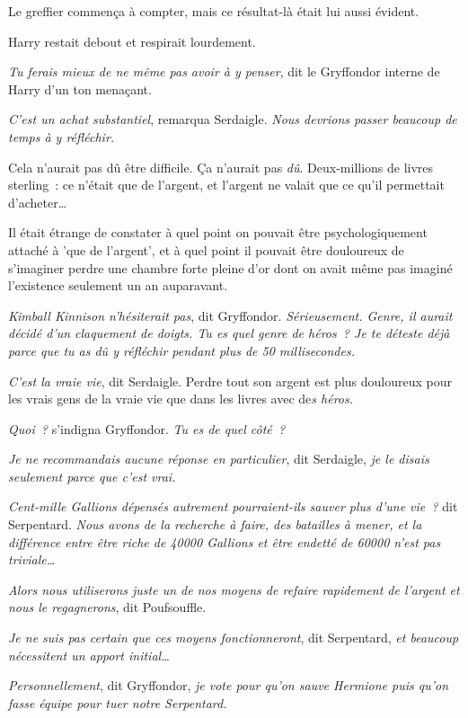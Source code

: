 Le greffier commença à compter, mais ce résultat-là était lui aussi évident.

Harry restait debout et respirait lourdement.

\emph{Tu ferais mieux de ne même pas avoir à y penser}, dit le Gryffondor interne de Harry d'un ton menaçant.

\emph{C'est un achat substantiel}, remarqua Serdaigle. \emph{Nous devrions passer beaucoup de temps à y réfléchir.}

Cela n'aurait pas dû être difficile. Ça n'aurait pas \emph{dû}. Deux-millions de livres sterling~: ce n'était que de l'argent, et l'argent ne valait que ce qu'il permettait d'acheter…

Il était étrange de constater à quel point on pouvait être psychologiquement attaché à 'que de l'argent', et à quel point il pouvait être douloureux de s'imaginer perdre une chambre forte pleine d'or dont on avait même pas imaginé l'existence seulement un an auparavant.

\emph{Kimball Kinnison n'hésiterait pas}, dit Gryffondor. \emph{Sérieusement. Genre, il aurait décidé d'un claquement de doigts. Tu es quel genre de héros~? Je te déteste déjà parce que tu as dû y réfléchir pendant plus de 50 millisecondes.}

\emph{C'est la vraie vie}, dit Serdaigle. Perdre tout son argent est plus douloureux pour les vrais gens de la vraie vie que dans les livres avec de\emph{s héros.}

\emph{Quoi~?} s'indigna Gryffondor. \emph{Tu es de quel côté~?}

\emph{Je ne recommandais aucune réponse en particulier}, dit Serdaigle, \emph{je le disais seulement parce que c'est vrai.}

\emph{Cent-mille Gallions dépensés autrement pourraient-ils sauver plus d'une vie~?} dit Serpentard. \emph{Nous avons de la recherche à faire, des batailles à mener, et la différence entre être riche de 40000 Gallions et être endetté de 60000 n'est pas triviale…}

\emph{Alors nous utiliserons juste un de nos moyens de refaire rapidement de l'argent et nous le regagnerons}, dit Poufsouffle.

\emph{Je ne suis pas certain que ces moyens fonctionneront}, dit Serpentard, \emph{et beaucoup nécessitent un apport initial…}

\emph{Personnellement}, dit Gryffondor, \emph{je vote pour qu'on sauve Hermione puis qu'on fasse équipe pour tuer notre Serpentard.}

